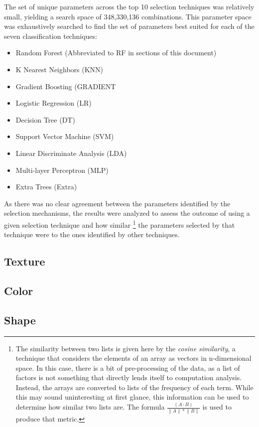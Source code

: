 \documentclass[letterpaper]{article}
\begin{document}
{The set of unique parameters across the top 10 selection techniques was relatively small, yielding a search space of 348,330,136 combinations. This parameter space was exhaustively searched to find the set of parameters best suited for each of the  seven classification techniques:
\begin{itemize}
	\item{Random Forest (Abbreviated to RF in sections of this document)}
	\item{K Nearest Neighbors (KNN)}
	\item{Gradient Boosting (GRADIENT}
	\item{Logistic Regression (LR)}
	\item{Decision Tree (DT)}
	\item{Support Vector Machine (SVM)}
	\item{Linear Discriminate Analysis (LDA)}
	\item{Multi-layer Perceptron (MLP)}
	\item{Extra Trees (Extra)}
\end{itemize}

As there was no clear agreement between the parameters identified by the selection mechanisms, the results were analyzed to assess the outcome of using a given selection technique and how similar 
\footnote{The similarity between two lists is given here by the \textit{cosine similarity}, a technique that considers the elements of an array as vectors in n-dimensional space. In this case, there is a bit of pre-processing of the data, as a list of factors is not something that directly lends itself to computation analysis. Instead, the arrays are converted to lists of the frequency of each term. While this may sound uninteresting at first glance, this information can be used to determine how similar two lists are. The formula $\frac {(A \cdot B)} { \lVert A \rVert * \lVert B \rVert }$ is used to produce that metric.}
the parameters selected by that technique were to the ones identified by other techniques. 

\subsection{Texture}
\subsection{Color}
\subsection{Shape}
}
\end{document}
